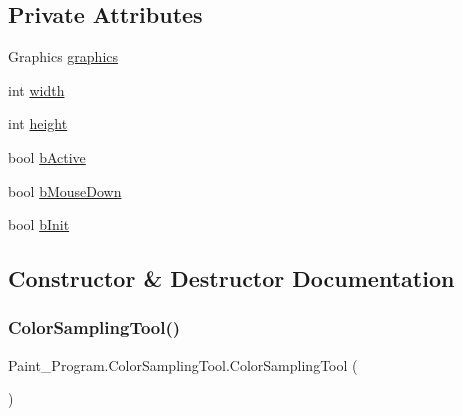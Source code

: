 \subsection*{Private Attributes}
\begin{DoxyCompactItemize}
\item 
Graphics \mbox{\hyperlink{class_paint___program_1_1_color_sampling_tool_a0e4873b76a158efcfe923e488ad263a8}{graphics}}
\item 
int \mbox{\hyperlink{class_paint___program_1_1_color_sampling_tool_a49225951211d3ec7e1a476cab018d365}{width}}
\item 
int \mbox{\hyperlink{class_paint___program_1_1_color_sampling_tool_a62c3dd721f6b2a4feac63a3ae8428867}{height}}
\item 
bool \mbox{\hyperlink{class_paint___program_1_1_color_sampling_tool_a9ccea4c70e5aa59fa159694e0e3068c3}{b\+Active}}
\item 
bool \mbox{\hyperlink{class_paint___program_1_1_color_sampling_tool_a576ddeb6ab1d6d358dd88a171862bccb}{b\+Mouse\+Down}}
\item 
bool \mbox{\hyperlink{class_paint___program_1_1_color_sampling_tool_ad168d5e0845269f7639d736945502870}{b\+Init}}
\end{DoxyCompactItemize}


\subsection{Constructor \& Destructor Documentation}
\mbox{\label{class_paint___program_1_1_color_sampling_tool_afaa3610c8758b8e047064b860472d1c9}} 
\subsubsection{\texorpdfstring{Color\+Sampling\+Tool()}{ColorSamplingTool()}}
{\footnotesize\ttfamily Paint\+\_\+\+Program.\+Color\+Sampling\+Tool.\+Color\+Sampling\+Tool (\begin{DoxyParamCaption}{ }\end{DoxyParamCaption})\hspace{0.3cm}{\ttfamily [inline]}}




